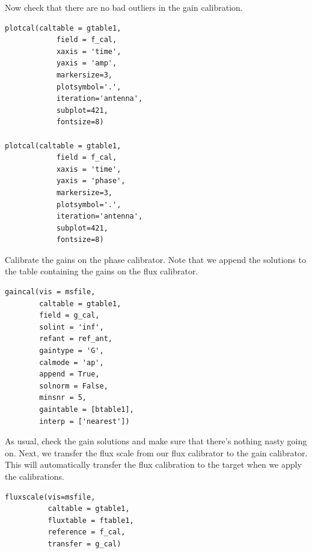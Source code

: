 \documentclass[force,almostfull,justified]{tufte-book}
\begin{document}
Now check that there are no bad outliers in the gain calibration.

\begin{casacmd}
\begin{verbatim}
plotcal(caltable = gtable1,
            field = f_cal,
            xaxis = 'time',
            yaxis = 'amp',
            markersize=3,
            plotsymbol='.',
            iteration='antenna',
            subplot=421,
            fontsize=8)

plotcal(caltable = gtable1,
            field = f_cal,
            xaxis = 'time',
            yaxis = 'phase',
            markersize=3,
            plotsymbol='.',
            iteration='antenna',
            subplot=421,
            fontsize=8)
\end{verbatim}
\end{casacmd}

Calibrate the gains on the phase calibrator. Note that we append the solutions to the table containing
the gains on the flux calibrator.

\begin{casacmd}
\begin{verbatim}
gaincal(vis = msfile,
        caltable = gtable1,
        field = g_cal,
        solint = 'inf',
        refant = ref_ant,
        gaintype = 'G',
        calmode = 'ap',
        append = True,
        solnorm = False,
        minsnr = 5,
        gaintable = [btable1],
        interp = ['nearest'])
\end{verbatim}
\end{casacmd}

As usual, check the gain solutions and make sure that there's nothing nasty going on.  Next, we
transfer the flux scale from our flux calibrator to the gain calibrator. This will automatically
transfer the flux calibration to the target when we apply the calibrations.

\begin{casacmd}
\begin{verbatim}
fluxscale(vis=msfile,
          caltable = gtable1,
          fluxtable = ftable1,
          reference = f_cal,
          transfer = g_cal)
\end{verbatim}
\end{casacmd}

\end{document}
